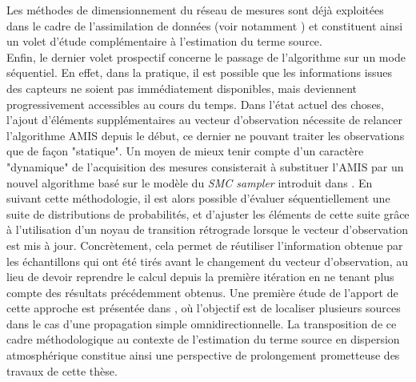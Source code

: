 Les méthodes de dimensionnement du réseau de mesures sont déjà exploitées dans le cadre de l'assimilation de données (voir notamment \cite{Abida2009}) et constituent ainsi un volet d'étude complémentaire à l'estimation du terme source.\\

Enfin, le dernier volet prospectif concerne le passage de l'algorithme sur un mode séquentiel. En effet, dans la pratique, il est possible que les informations issues des capteurs ne soient pas immédiatement disponibles, mais deviennent progressivement accessibles au cours du temps. Dans l'état actuel des choses, l'ajout d'éléments supplémentaires au vecteur d'observation nécessite de relancer l'algorithme AMIS depuis le début, ce dernier ne pouvant traiter les observations que de façon "statique". Un moyen de mieux tenir compte d'un caractère "dynamique" de l'acquisition des mesures consisterait à substituer l'AMIS par un nouvel algorithme basé sur le modèle du \textit{SMC sampler} introduit dans \cite{Delmoral2006}. En suivant cette méthodologie, il est alors possible d'évaluer séquentiellement une suite de distributions de probabilités, et d'ajuster les éléments de cette suite grâce à l'utilisation d'un noyau de transition rétrograde lorsque le vecteur d'observation est mis à jour. Concrètement, cela permet de réutiliser l'information obtenue par les échantillons qui ont été tirés avant le changement du vecteur d'observation, au lieu de devoir reprendre le calcul depuis la première itération en ne tenant plus compte des résultats précédemment obtenus. {Une première étude de l'apport de cette approche est présentée dans \cite{Nguyen2016b}, où l'objectif est de localiser plusieurs sources dans le cas d'une propagation simple omnidirectionnelle. La transposition de ce cadre méthodologique au contexte de l'estimation du terme source en dispersion atmosphérique constitue ainsi une perspective de prolongement prometteuse des travaux de cette thèse.} 




